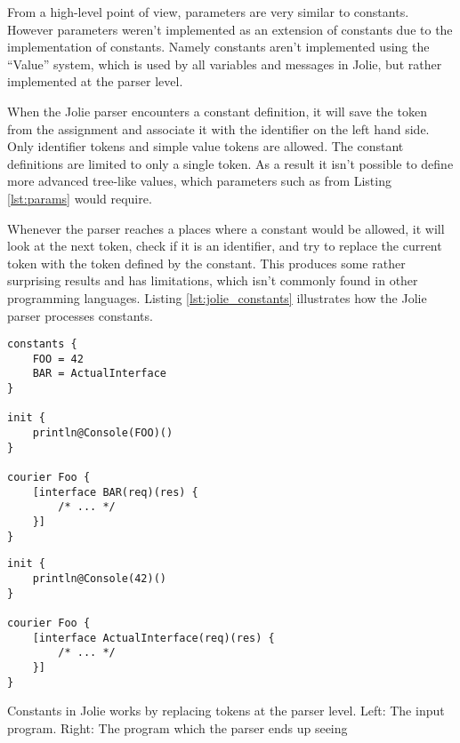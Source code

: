From a high-level point of view, parameters are very similar to constants.
However parameters weren't implemented as an extension of constants due to the
implementation of constants. Namely constants aren't implemented using the
``Value'' system, which is used by all variables and messages in Jolie, but
rather implemented at the parser level.

When the Jolie parser encounters a constant definition, it will save the token
from the assignment and associate it with the identifier on the left hand side.
Only identifier tokens and simple value tokens are allowed. The constant
definitions are limited to only a single token. As a result it isn't possible
to define more advanced tree-like values, which parameters such as
 from Listing \ref{lst:params} would require.

Whenever the parser reaches a places where a constant would be allowed, it will
look at the next token, check if it is an identifier, and try to replace the
current token with the token defined by the constant. This produces some rather
surprising results and has limitations, which isn't commonly found in other
programming languages.  Listing \ref{lst:jolie_constants} illustrates how the
Jolie parser processes constants.

\begin{listing}[H]
\begin{multicols}{2}

\begin{verbatim}
constants {
    FOO = 42
    BAR = ActualInterface
}

init {
    println@Console(FOO)()
}

courier Foo {
    [interface BAR(req)(res) {
        /* ... */
    }]
}
\end{verbatim}

\columnbreak

\begin{verbatim}
init {
    println@Console(42)()
}

courier Foo {
    [interface ActualInterface(req)(res) {
        /* ... */
    }]
}
\end{verbatim}

\end{multicols}

\caption{Constants in Jolie works by replacing tokens at the parser level. Left:
    The input program. Right: The program which the parser ends up seeing}

\label{lst:jolie_constants}

\end{listing}

